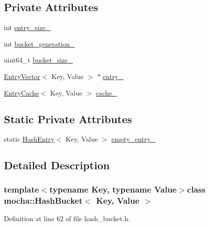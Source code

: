 \subsection*{Private Attributes}
\begin{DoxyCompactItemize}
\item 
int \hyperlink{classmocha_1_1_hash_bucket_adde3d5a33a7ec825755c01cf759b8198}{entry\_\-size\_\-}
\item 
int \hyperlink{classmocha_1_1_hash_bucket_ab52abe3e83f5d679211db5386bed0ca8}{bucket\_\-generation\_\-}
\item 
uint64\_\-t \hyperlink{classmocha_1_1_hash_bucket_add3cde17cfde167c3aeb3f083e39d740}{bucket\_\-size\_\-}
\item 
\hyperlink{structmocha_1_1_entry_vector}{EntryVector}$<$ Key, Value $>$ $\ast$ \hyperlink{classmocha_1_1_hash_bucket_ab72765abd9c87c46dfe2994872527cbe}{entry\_\-}
\item 
\hyperlink{classmocha_1_1_entry_cache}{EntryCache}$<$ Key, Value $>$ \hyperlink{classmocha_1_1_hash_bucket_a035c907a461a625b46de064db5ac3677}{cache\_\-}
\end{DoxyCompactItemize}
\subsection*{Static Private Attributes}
\begin{DoxyCompactItemize}
\item 
static \hyperlink{classmocha_1_1_hash_entry}{HashEntry}$<$ Key, Value $>$ \hyperlink{classmocha_1_1_hash_bucket_a6c74531aad8a59a84651e953cb6e0872}{empty\_\-entry\_\-}
\end{DoxyCompactItemize}


\subsection{Detailed Description}
\subsubsection*{template$<$typename Key, typename Value$>$class mocha::HashBucket$<$ Key, Value $>$}



Definition at line 62 of file hash\_\-bucket.h.



